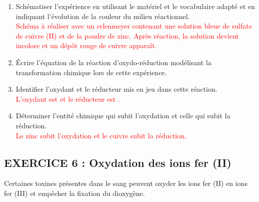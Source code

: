\documentclass[10pt,a4paper]{article}
\begin{document}
\begin{enumerate}
    \item Schématiser l'expérience en utilisant le matériel et le vocabulaire adapté et en indiquant l'évolution de la couleur du milieu réactionnel. \\
    \textcolor{red}{Schéma à réaliser avec un erlenmeyer contenant une solution bleue de sulfate de cuivre (II) et de la poudre de zinc. Après réaction, la solution devient incolore et un dépôt rouge de cuivre apparaît.}

    \item Écrire l'équation de la réaction d'oxydo-réduction modélisant la transformation chimique lors de cette expérience. \\
    \textcolor{red}{}

    \item Identifier l'oxydant et le réducteur mis en jeu dans cette réaction. \\
    \textcolor{red}{L'oxydant est  et le réducteur est .}

    \item Déterminer l'entité chimique qui subit l'oxydation et celle qui subit la réduction. \\
    \textcolor{red}{Le zinc subit l'oxydation et le cuivre subit la réduction.}
\end{enumerate}

\subsection*{EXERCICE 6 : Oxydation des ions fer (II)}

Certaines toxines présentes dans le sang peuvent oxyder les ions fer (II) en ions fer (III) et empêcher la fixation du dioxygène.
\end{document}
